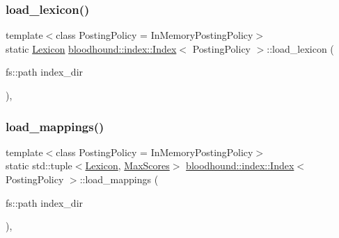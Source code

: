 \subsubsection{\texorpdfstring{load\+\_\+lexicon()}{load\_lexicon()}}
{\footnotesize\ttfamily template$<$class Posting\+Policy = In\+Memory\+Posting\+Policy$>$ \\
static \hyperlink{namespacebloodhound_a94032a3533df0a1b6d3435bad57e6499}{Lexicon} \hyperlink{classbloodhound_1_1index_1_1Index}{bloodhound\+::index\+::\+Index}$<$ Posting\+Policy $>$\+::load\+\_\+lexicon (\begin{DoxyParamCaption}\item[{fs\+::path}]{index\+\_\+dir }\end{DoxyParamCaption})\hspace{0.3cm}{\ttfamily [inline]}, {\ttfamily [static]}}

\mbox{\label{classbloodhound_1_1index_1_1Index_a779359e7ce40294dd3d3666c00762700}} 
\subsubsection{\texorpdfstring{load\+\_\+mappings()}{load\_mappings()}}
{\footnotesize\ttfamily template$<$class Posting\+Policy = In\+Memory\+Posting\+Policy$>$ \\
static std\+::tuple$<$\hyperlink{namespacebloodhound_a94032a3533df0a1b6d3435bad57e6499}{Lexicon}, \hyperlink{namespacebloodhound_a687d80c6f992eba8b820bf30a482f4b4}{Max\+Scores}$>$ \hyperlink{classbloodhound_1_1index_1_1Index}{bloodhound\+::index\+::\+Index}$<$ Posting\+Policy $>$\+::load\+\_\+mappings (\begin{DoxyParamCaption}\item[{fs\+::path}]{index\+\_\+dir }\end{DoxyParamCaption})\hspace{0.3cm}{\ttfamily [inline]}, {\ttfamily [static]}}

\mbox{\label{classbloodhound_1_1index_1_1Index_a6333778f622dbf964ba6aea29a56dca0}} 
